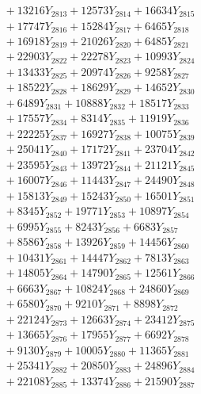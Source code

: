 \documentclass[a4paper,10pt]{article}
\begin{document}
{\begin{align}
&\;  + 13216 Y_{2813} + 12573 Y_{2814} + 16634 Y_{2815} \\[0.3ex]
&\;  + 17747 Y_{2816} + 15284 Y_{2817} + 6465 Y_{2818} \\[0.5ex]\allowbreak
&\;  + 16918 Y_{2819} + 21026 Y_{2820} + 6485 Y_{2821} \\[0.3ex]
&\;  + 22903 Y_{2822} + 22278 Y_{2823} + 10993 Y_{2824} \\[0.3ex]
&\;  + 13433 Y_{2825} + 20974 Y_{2826} + 9258 Y_{2827} \\[0.3ex]
&\;  + 18522 Y_{2828} + 18629 Y_{2829} + 14652 Y_{2830} \\[0.3ex]
&\;  + 6489 Y_{2831} + 10888 Y_{2832} + 18517 Y_{2833} \\[0.3ex]
&\;  + 17557 Y_{2834} + 8314 Y_{2835} + 11919 Y_{2836} \\[0.3ex]
&\;  + 22225 Y_{2837} + 16927 Y_{2838} + 10075 Y_{2839} \\[0.3ex]
&\;  + 25041 Y_{2840} + 17172 Y_{2841} + 23704 Y_{2842} \\[0.3ex]
&\;  + 23595 Y_{2843} + 13972 Y_{2844} + 21121 Y_{2845} \\[0.3ex]
&\;  + 16007 Y_{2846} + 11443 Y_{2847} + 24490 Y_{2848} \\[0.5ex]\allowbreak
&\;  + 15813 Y_{2849} + 15243 Y_{2850} + 16501 Y_{2851} \\[0.3ex]
&\;  + 8345 Y_{2852} + 19771 Y_{2853} + 10897 Y_{2854} \\[0.3ex]
&\;  + 6995 Y_{2855} + 8243 Y_{2856} + 6683 Y_{2857} \\[0.3ex]
&\;  + 8586 Y_{2858} + 13926 Y_{2859} + 14456 Y_{2860} \\[0.3ex]
&\;  + 10431 Y_{2861} + 14447 Y_{2862} + 7813 Y_{2863} \\[0.3ex]
&\;  + 14805 Y_{2864} + 14790 Y_{2865} + 12561 Y_{2866} \\[0.3ex]
&\;  + 6663 Y_{2867} + 10824 Y_{2868} + 24860 Y_{2869} \\[0.3ex]
&\;  + 6580 Y_{2870} + 9210 Y_{2871} + 8898 Y_{2872} \\[0.3ex]
&\;  + 22124 Y_{2873} + 12663 Y_{2874} + 23412 Y_{2875} \\[0.3ex]
&\;  + 13665 Y_{2876} + 17955 Y_{2877} + 6692 Y_{2878} \\[0.5ex]\allowbreak
&\;  + 9130 Y_{2879} + 10005 Y_{2880} + 11365 Y_{2881} \\[0.3ex]
&\;  + 25341 Y_{2882} + 20850 Y_{2883} + 24896 Y_{2884} \\[0.3ex]
&\;  + 22108 Y_{2885} + 13374 Y_{2886} + 21590 Y_{2887} \\[0.3ex]

\end{align}}
\end{document}
